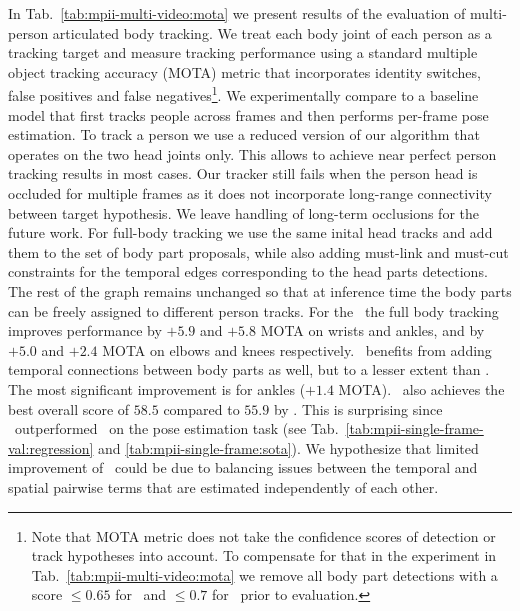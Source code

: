  In Tab.~\ref{tab:mpii-multi-video:mota} we present results of the
evaluation of multi-person articulated body tracking. We treat each body joint of each person as a
tracking target and measure tracking performance using a standard multiple object tracking accuracy
(MOTA) metric \cite{Bernardin:2008:CLE} that incorporates identity switches, false positives and
false negatives\footnote{Note that MOTA metric does not take the confidence scores of detection or
  track hypotheses into account. To compensate for that in the experiment in
  Tab.~\ref{tab:mpii-multi-video:mota} we remove all body part detections with a score 
  $\leq 0.65$ for \busparse~and $\leq 0.7$ for \tdbushort~prior to evaluation.}. We experimentally compare to a baseline model that first tracks people
across frames and then performs per-frame pose estimation.
To track a person we use a reduced version of our algorithm that operates on the two head
joints only. This allows to achieve near perfect person tracking results in most cases. Our tracker still fails
when the person head is occluded for multiple frames as it does not incorporate long-range
connectivity between target hypothesis. We leave handling of long-term occlusions for the future
work.
For full-body tracking we use the same inital head tracks and add them to the set of body part
proposals, while also adding must-link and must-cut constraints for the temporal edges corresponding
to the head parts detections.
The rest of the graph remains unchanged so that at inference time the body parts can be freely
assigned to different person tracks. For the \busparse{}~the full body tracking improves performance
by $+5.9$ and $+5.8$ MOTA on wrists and ankles, and by $+5.0$ and $+2.4$ MOTA on elbows and knees
respectively. \tdbushort~benefits from adding temporal connections between body parts as well, but
to a lesser extent than \busparse{}. The most significant improvement is for ankles ($+1.4$
MOTA). \busparse{}~also achieves the best overall score of $58.5$ compared to $55.9$ by \tdbushort.
 This is surprising since \tdbushort~outperformed \busparse~on the pose
estimation task (see Tab.~\ref{tab:mpii-single-frame-val:regression} and
\ref{tab:mpii-single-frame:sota}). We hypothesize that limited improvement of \tdbushort~could be
due to balancing issues between the temporal and spatial pairwise terms that are estimated
independently of each other.
\tabcolsep 1.5pt
